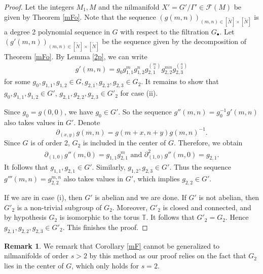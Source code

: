 \documentclass[12pt,amstex]{amsart}
\theoremstyle{definition}
\newtheorem{rem}[thm]{Remark}
\begin{document}
\begin{proof}
Let the integers $M_{1}, M$ and the nilmanifold $X'=G'/\Gamma'\in\mathcal{F}
(M)$ be given by Theorem \ref{mFo}. Note that the sequence
$(g(m,n))_{(m,n)\in[\tilde{N}]\times[\tilde{N}]}$ is a degree 2 polynomial sequence in $G$
with respect to the filtration $G_{\bullet}$. Let
$(g'(m,n))_{(m,n)\in[\tilde{N}]\times[\tilde{N}]}$ be the sequence given by the decomposition
of Theorem \ref{mFo}. By Lemma \ref{2p}, we can write
\begin{equation}\nonumber
  \begin{split}
  g'(m,n)=g_{0}g_{1,1}^{m}g_{1,2}^{n}g_{2,1}^{\binom{m}{2}}g_{2,2}^{mn}g_{2,3}^{\binom{n}{2}}
  \end{split}
\end{equation}
for some $g_{0}, g_{1,1}, g_{1,2}\in G, g_{2,1},g_{2,2},g_{2,3}\in G_{2}$.
It remains to show that
$g_{0}, g_{1,1}, g_{1,2}\in G'$, $g_{2,1},g_{2,2},g_{2,3}\in G'_{2}$
for case (ii).

Since $g_{0}=g(0,0)$, we have $g_{0}\in G'$. So the sequence
$g''(m,n)=g_{0}^{-1}g'(m,n)$ also takes values in $G'$.
Denote
$$\partial_{(x,y)}g(m,n)=g(m+x,n+y)g(m,n)^{-1}.$$ Since $G$ is of order 2,
$G_{2}$ is included in the center of $G$. Therefore, we obtain
\begin{equation}\nonumber
  \begin{split}
  \partial_{(1,0)}g''(m,0)=g_{1,1}g_{2,1}^{m} \text{ and }
  \partial_{(1,0)}^{2}g''(m,0)=g_{2,1}.
  \end{split}
\end{equation}
It follows that $g_{1,1},g_{2,1}\in G'$. Similarly,
$g_{1,2},g_{2,3}\in G'$. Thus the sequence
$g'''(m,n)=g_{2,2}^{m,n}$ also takes values in $G'$, which implies
$g_{2,2}\in G'$.

If we are in case (i), then $G'$ is abelian and we are done. If
$G'$ is not abelian, then $G'_{2}$ is a non-trivial subgroup of $G_{2}$.
Moreover, $G'_{2}$ is closed and connected, and by hypothesis $G_{2}$
is isomorphic to the torus $\mathbb{T}$. It follows that $G'_{2}=G_{2}$.
Hence $g_{2,1},g_{2,2},g_{2,3}\in G'_{2}$. This finishes the proof.
\end{proof}

\begin{rem}\label{mF2}
  We remark that Corollary \ref{mF} cannot be generalized to nilmanifolds of order $s>2$ by this method as our proof relies on the fact that $G_{2}$ lies in the center of $G$, which only holds for $s=2$.
\end{rem}
\end{document}
